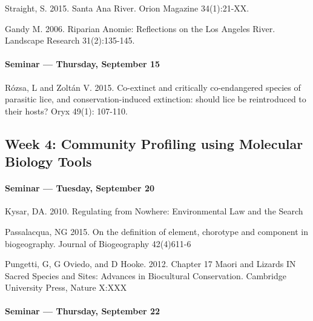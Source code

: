       \begin{itemize*}
      \item Straight, S. 2015. Santa Ana River. Orion Magazine 34(1):21-XX.
      \item Gandy M. 2006. Riparian Anomie: Reflections on the Los Angeles River. Landscape Research 31(2):135-145.
      \end{itemize*}
      

      
      \paragraph{Seminar --- Thursday, September 15}
      
      \begin{itemize*}
      \item R\'{o}zsa, L and Zolt\'{a}n V. 2015. Co-extinct and critically co-endangered species of parasitic lice, and conservation-induced extinction: should lice be reintroduced to their hosts? Oryx 49(1): 107-110.
      \end{itemize*}
      

    
    
    \subsection{\textbf{Week 4}: Community Profiling using Molecular Biology Tools}
    
    \paragraph{Seminar --- Tuesday, September 20}
    
    \begin{itemize*}
    \item Kysar, DA. 2010. Regulating from Nowhere: Environmental Law and the Search 
    \href{https://books.google.com/books?isbn=0300163304}{} 
    \item Passalacqua, NG 2015. On the definition of element, chorotype and component in biogeography. Journal of Biogeography 42(4)611-6
    \item Pungetti, G, G Oviedo, and D Hooke. 2012. Chapter 17 Maori and Lizards IN Sacred Species and Sites: Advances in Biocultural Conservation. Cambridge University Press, Nature X:XXX
    \end{itemize*}
    

    
    
    \paragraph{Seminar --- Thursday, September 22}		
    
